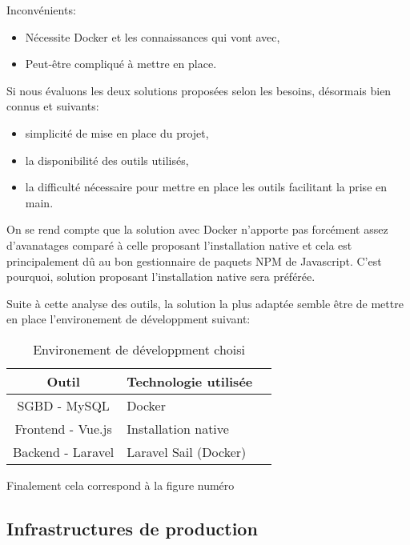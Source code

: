 \documentclass[
    iai, %
    il, %
]{heig-tb}
\begin{document}
Inconvénients:
\begin{itemize}
    \item Nécessite Docker et les connaissances qui vont avec,
    \item Peut-être compliqué à mettre en place.
\end{itemize}

Si nous évaluons les deux solutions proposées selon les besoins, désormais bien connus et suivants:
\begin{itemize}
    \item simplicité de mise en place du projet,
    \item la disponibilité des outils utilisés,
    \item la difficulté nécessaire pour mettre en place les outils facilitant la prise en main.
\end{itemize}

On se rend compte que la solution avec Docker n'apporte pas forcément assez d'avanatages comparé à celle proposant l'installation native et cela est principalement dû au bon gestionnaire de paquets NPM de Javascript. C'est pourquoi, solution proposant l'installation native sera préférée.

Suite à cette analyse des outils, la solution la plus adaptée semble être de mettre en place l'environement de développment suivant:

\begin{table}[h]
    \begin{center}
        \caption{Environement de développment choisi \label{env_dev}}
        \begin{tabular}{c|l|r}
            Outil             & Technologie utilisée  \\ \hline
            SGBD - MySQL      & Docker                \\
            Frontend - Vue.js & Installation native   \\
            Backend - Laravel & Laravel Sail (Docker) \\
        \end{tabular}
    \end{center}
\end{table}


Finalement cela correspond à la figure numéro %

\clearpage
\subsection{Infrastructures de production}
\end{document}
